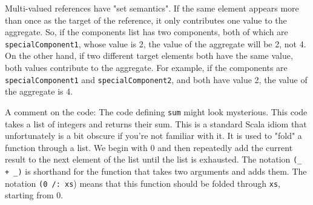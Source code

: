 Multi-valued references have "set semantics". If the same element appears more than once as the target of the reference, it only contributes one value to the aggregate. So, if the components list has two components, both of which are \texttt{specialComponent1}, whose value is 2, the value of the aggregate will be 2, not 4. On the other hand, if two different target elements both have the same value, both values contribute to the aggregate. For example, if the components are \texttt{specialComponent1} and \texttt{specialComponent2}, and both have value 2, the value of the aggregate is 4.

A comment on the code: The code defining \texttt{sum} might look mysterious. This code takes a list of integers and returns their sum. This is a standard Scala idiom that unfortunately is a bit obscure if you're not familiar with it. It is used to "fold" a function through a list. We begin with 0 and then repeatedly add the current result to the next element of the list until the list is exhausted. The notation \texttt{(\_ + \_)} is shorthand for the function that takes two arguments and adds them. The notation \texttt{(0 /: xs}) means that this function should be folded through \texttt{xs}, starting from 0.



